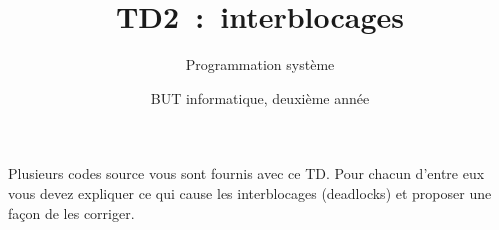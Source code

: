 \documentclass[a4paper]{article}
\title{TD2~: interblocages}
\author{Programmation système}
\date{BUT informatique, deuxième année}
\begin{document}
\maketitle{}

Plusieurs codes source vous sont fournis avec ce TD.
Pour chacun d'entre eux vous devez expliquer ce qui cause les interblocages (deadlocks) et proposer une façon de les corriger.
\end{document}
